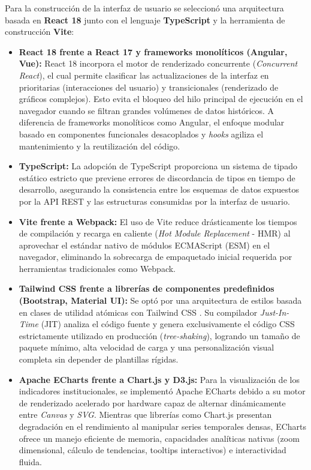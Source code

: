 Para la construcción de la interfaz de usuario se seleccionó una arquitectura basada en \textbf{React 18} junto con el lenguaje \textbf{TypeScript} y la herramienta de construcción \textbf{Vite}:
\begin{itemize}
    \item \textbf{React 18 frente a React 17 y frameworks monolíticos (Angular, Vue):} React 18 \cite{react2024} incorpora el motor de renderizado concurrente (\textit{Concurrent React}), el cual permite clasificar las actualizaciones de la interfaz en prioritarias (interacciones del usuario) y transicionales (renderizado de gráficos complejos). Esto evita el bloqueo del hilo principal de ejecución en el navegador cuando se filtran grandes volúmenes de datos históricos. A diferencia de frameworks monolíticos como Angular, el enfoque modular basado en componentes funcionales desacoplados y \textit{hooks} agiliza el mantenimiento y la reutilización del código.
    \item \textbf{TypeScript:} La adopción de TypeScript \cite{bierman2014} proporciona un sistema de tipado estático estricto que previene errores de discordancia de tipos en tiempo de desarrollo, asegurando la consistencia entre los esquemas de datos expuestos por la API REST y las estructuras consumidas por la interfaz de usuario.
    \item \textbf{Vite frente a Webpack:} El uso de Vite \cite{you2024} reduce drásticamente los tiempos de compilación y recarga en caliente (\textit{Hot Module Replacement} - HMR) al aprovechar el estándar nativo de módulos ECMAScript (ESM) en el navegador, eliminando la sobrecarga de empaquetado inicial requerida por herramientas tradicionales como Webpack.
    \item \textbf{Tailwind CSS frente a librerías de componentes predefinidos (Bootstrap, Material UI):} Se optó por una arquitectura de estilos basada en clases de utilidad atómicas con Tailwind CSS \cite{wathan2024}. Su compilador \textit{Just-In-Time} (JIT) analiza el código fuente y genera exclusivamente el código CSS estrictamente utilizado en producción (\textit{tree-shaking}), logrando un tamaño de paquete mínimo, alta velocidad de carga y una personalización visual completa sin depender de plantillas rígidas.
    \item \textbf{Apache ECharts frente a Chart.js y D3.js:} Para la visualización de los indicadores institucionales, se implementó Apache ECharts \cite{echarts2018} debido a su motor de renderizado acelerado por hardware capaz de alternar dinámicamente entre \textit{Canvas} y \textit{SVG}. Mientras que librerías como Chart.js presentan degradación en el rendimiento al manipular series temporales densas, ECharts ofrece un manejo eficiente de memoria, capacidades analíticas nativas (zoom dimensional, cálculo de tendencias, tooltips interactivos) e interactividad fluida.
\end{itemize}

